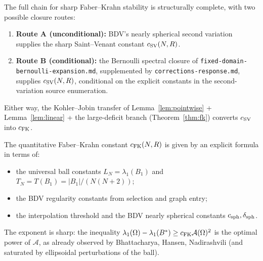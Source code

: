 \documentclass[11pt]{article}
\theoremstyle{definition}
\newcommand{\abs}[1]{\left|#1\right|}
\begin{document}
The full chain for sharp Faber--Krahn stability is structurally complete,
with two possible closure routes:
\begin{enumerate}
\item \textbf{Route A (unconditional):} BDV's nearly spherical second
variation supplies the sharp Saint--Venant constant $c_{\rm SV}(N,R)$.
\item \textbf{Route B (conditional):} the Bernoulli spectral closure of
\texttt{fixed-domain-bernoulli-expansion.md}, supplemented by
\texttt{corrections-response.md}, supplies $c_{\rm SV}(N,R)$, conditional on
the explicit constants in the second-variation source enumeration.
\end{enumerate}
Either way, the Kohler--Jobin transfer of Lemma~\ref{lem:pointwise} +
Lemma~\ref{lem:linear} + the large-deficit branch (Theorem~\ref{thm:fk}) converts
$c_{\rm SV}$ into $c_{\rm FK}$.

The quantitative Faber--Krahn constant $c_{\rm FK}(N,R)$ is given by an
explicit formula in terms of:
\begin{itemize}
\item the universal ball constants $L_N=\lambda_1(B_1)$ and
$T_N=T(B_1)=\abs{B_1}/(N(N+2))$;
\item the BDV regularity constants from selection and graph entry;
\item the interpolation threshold and the BDV nearly spherical constants
\(c_{\rm sph},\delta_{\rm sph}\).
\end{itemize}

The exponent is sharp: the inequality
$\lambda_1(\Omega)-\lambda_1(B^*)\ge c_{\rm FK}\mathcal A(\Omega)^2$ is the
optimal power of $\mathcal A$, as already observed by Bhattacharya, Hansen,
Nadirashvili (and saturated by ellipsoidal perturbations of the ball).
\end{document}
